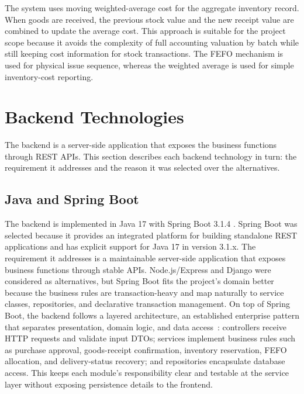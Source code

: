 The system uses moving weighted-average cost for the aggregate inventory record.
When goods are received, the previous stock value and the new receipt value are
combined to update the average cost. This approach is suitable for the project
scope because it avoids the complexity of full accounting valuation by batch
while still keeping cost information for stock transactions. The FEFO mechanism
is used for physical issue sequence, whereas the weighted average is used for
simple inventory-cost reporting.

\section{Backend Technologies}
The backend is a server-side application that exposes the business functions
through REST APIs. This section describes each backend technology in turn: the
requirement it addresses and the reason it was selected over the alternatives.

\subsection{Java and Spring Boot}
The backend is implemented in Java 17 with Spring Boot 3.1.4
\cite{springboot314}. Spring Boot was selected because it provides an integrated
platform for building standalone REST applications and has explicit support for
Java 17 in version 3.1.x. The requirement it addresses is a maintainable
server-side application that exposes business functions through stable APIs.
Node.js/Express and Django were considered as alternatives, but Spring Boot fits
the project's domain better because the business rules are transaction-heavy and
map naturally to service classes, repositories, and declarative transaction
management. On top of Spring Boot, the backend follows a layered architecture, an
established enterprise pattern that separates presentation, domain logic, and
data access~\cite{fowler2002poeaa}: controllers receive HTTP requests and
validate input DTOs; services implement business rules such as purchase approval,
goods-receipt confirmation, inventory reservation, FEFO allocation, and
delivery-status recovery; and repositories encapsulate database access. This
keeps each module's responsibility clear and testable at the service layer
without exposing persistence details to the frontend.

